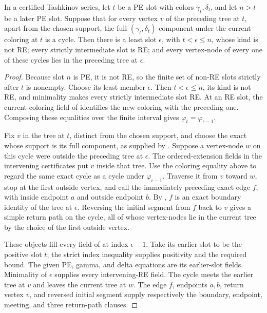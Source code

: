 \begin{helper}
In a certified Tashkinov series, let \(t\) be a PE slot with colors
\(\gamma_t,\delta_t\), and let \(n>t\) be a later PE slot.  Suppose that
for every vertex \(v\) of the preceding tree at \(t\), apart from the
chosen support, the full \((\gamma_t,\delta_t)\)-component under the
current coloring at \(t\) is a cycle.  Then there is a least slot
\(\epsilon\), with \(t<\epsilon\le n\), whose kind is not RE; every
strictly intermediate slot is RE; and every vertex-node of every one of
these cycles lies in the preceding tree at \(\epsilon\).
\end{helper}
\begin{proof}
Because slot \(n\) is PE, it is not RE, so the finite set of non-RE
slots strictly after \(t\) is nonempty.  Choose its least member
\(\epsilon\).  Then \(t<\epsilon\le n\), its kind is not RE, and
minimality makes every strictly intermediate slot RE.  At an RE slot,
the current-coloring field of  identifies
the new coloring with the preceding one.  Composing these equalities
over the finite interval gives
\(\varphi_t=\varphi_{\epsilon-1}\).

Fix \(v\) in the tree at \(t\), distinct from the chosen support, and
choose the exact  whose support is its full
component, as supplied by .  Suppose a
vertex-node \(w\) on this cycle were outside the preceding tree at
\(\epsilon\).  The ordered-extension fields in the intervening
 certificates put \(v\) inside that tree.
Use the coloring equality above to regard the same exact cycle as a
cycle under \(\varphi_{\epsilon-1}\).  Traverse it from \(v\) toward
\(w\), stop at the first outside vertex, and call the immediately
preceding exact edge \(f\), with inside endpoint \(a\) and outside
endpoint \(b\).  By , \(f\) is an exact boundary
identity of the tree at \(\epsilon\).  Reversing the initial segment
from \(f\) back to \(v\) gives a simple return path on the cycle, all of
whose vertex-nodes lie in the current tree by the choice of the first
outside vertex.

These objects fill every field of
 at index \(\epsilon-1\).
Take its earlier slot to be the positive slot \(t\); the strict index
inequality supplies positivity and the required bound.  The given PE,
gamma, and delta equations are its earlier-slot fields.  Minimality of
\(\epsilon\) supplies every intervening-RE field.  The cycle meets the
earlier tree at \(v\) and leaves the current tree at \(w\).  The edge
\(f\), endpoints \(a,b\), return vertex \(v\), and reversed initial
segment supply respectively the boundary, endpoint, meeting, and three
return-path clauses.


\end{proof}
